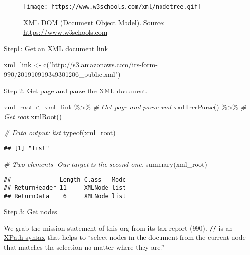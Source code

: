 \documentclass[
]{book}
\newenvironment{Shaded}{\begin{snugshade}}{\end{snugshade}}
\newcommand{\CommentTok}[1]{\textcolor[rgb]{0.56,0.35,0.01}{\textit{#1}}}
\newcommand{\FunctionTok}[1]{\textcolor[rgb]{0.00,0.00,0.00}{#1}}
\newcommand{\NormalTok}[1]{#1}
\newcommand{\OtherTok}[1]{\textcolor[rgb]{0.56,0.35,0.01}{#1}}
\newcommand{\SpecialCharTok}[1]{\textcolor[rgb]{0.00,0.00,0.00}{#1}}
\newcommand{\StringTok}[1]{\textcolor[rgb]{0.31,0.60,0.02}{#1}}
\begin{document}
\begin{figure}
\centering
\texttt{[image: https://www.w3schools.com/xml/nodetree.gif]}
\caption{XML DOM (Document Object Model). Source: \url{https://www.w3schools.com}}
\end{figure}

Step1: Get an XML document link

\begin{Shaded}
\begin{Highlighting}[]
\NormalTok{xml\_link }\OtherTok{\textless{}{-}} \FunctionTok{c}\NormalTok{(}\StringTok{"http://s3.amazonaws.com/irs{-}form{-}990/201910919349301206\_public.xml"}\NormalTok{)}
\end{Highlighting}
\end{Shaded}

Step 2: Get page and parse the XML document.

\begin{Shaded}
\begin{Highlighting}[]
\NormalTok{xml\_root }\OtherTok{\textless{}{-}}\NormalTok{ xml\_link }\SpecialCharTok{\%\textgreater{}\%}
  \CommentTok{\# Get page and parse xml }
  \FunctionTok{xmlTreeParse}\NormalTok{() }\SpecialCharTok{\%\textgreater{}\%}
  \CommentTok{\# Get root}
  \FunctionTok{xmlRoot}\NormalTok{()}

\CommentTok{\# Data output: list }
\FunctionTok{typeof}\NormalTok{(xml\_root) }
\end{Highlighting}
\end{Shaded}

\begin{verbatim}
## [1] "list"
\end{verbatim}

\begin{Shaded}
\begin{Highlighting}[]
\CommentTok{\# Two elements. Our target is the second one.}
\FunctionTok{summary}\NormalTok{(xml\_root)}
\end{Highlighting}
\end{Shaded}

\begin{verbatim}
##              Length Class   Mode
## ReturnHeader 11     XMLNode list
## ReturnData    6     XMLNode list
\end{verbatim}

Step 3: Get nodes

We grab the mission statement of this org from its tax report (990). \texttt{//} is an \href{https://www.w3schools.com/xml/xpath_syntax.asp}{XPath syntax} that helps to ``select nodes in the document from the current node that matches the selection no matter where they are.''
\end{document}
